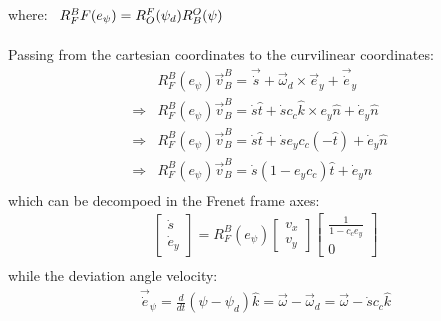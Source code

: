 \documentclass[12pt]{article}
\begin{document}
            where:  $ \begin{array}[t]{l}
                        R_F^BF(e_{\psi}) = R_O^F(\psi_d) R_B^O(\psi)
                    \end{array} $ \\
                    \\
            Passing from the cartesian coordinates to the curvilinear coordinates:
            \begin{equation}
                \begin{aligned}
                    & R_F^B(e_{\psi}) \vec{v}_B^B = \vec{\dot{s}} + \vec{\omega}_d \times \vec{e}_y + \vec{\dot{e}}_y \\
                    \Rightarrow & R_F^B(e_{\psi}) \vec{v}_B^B = \dot{s} \hat{t} + \dot{s} c_c \hat{k} \times e_y \hat{n} + \dot{e}_y \hat{n} \\
                    \Rightarrow & R_F^B(e_{\psi}) \vec{v}_B^B = \dot{s} \hat{t} + \dot{s} e_y c_c (-\hat{t}) + \dot{e}_y \hat{n} \\
                    \Rightarrow & R_F^B(e_{\psi}) \vec{v}_B^B = \dot{s} (1 - e_y c_c ) \hat{t} + \dot{e}_y \hat{n} \\
                \end{aligned}
            \end{equation}
            which can be decompoed in the Frenet frame axes:
            \begin{equation}
                \begin{aligned}
                    & \begin{bmatrix} \dot{s} \\ \dot{e}_y \end{bmatrix} 
                    = 
                    R^B_F(e_{\psi}) \begin{bmatrix} v_x \\ v_y \end{bmatrix} \begin{bmatrix} \frac{1}{1 - c_c e_y} \\ 0 \end{bmatrix} \\
                \end{aligned}
            \end{equation}
            while the deviation angle velocity:
            \begin{equation}
                \begin{aligned}
                    & \vec{\dot{e}}_{\psi} = \frac{d}{dt} (\psi - \psi_d) \hat{k} = \vec{\omega} - \vec{\omega}_d = \vec{\omega} - \dot{s} c_c \hat{k} \\
                \end{aligned}
            \end{equation}
\end{document}
